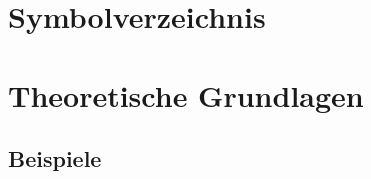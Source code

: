 \documentclass[%
	BCOR12mm, %
	cleardoublepage=empty, %
	tablecaptionabove, %
	toc=bib, %
	toc=listofnumbered, %
	listof=leveldown, %
	numbers=noendperiod %
	]{scrbook}
\begin{document}

\frontmatter

\tableofcontents
\chapter{Symbolverzeichnis} %
\label{cha:symbolverzeichnis}


\mainmatter


\chapter{Theoretische Grundlagen} %
\label{cha:theoretische_grundlagen}

\section{Beispiele} %
\label{sec:beispiele}
\end{document}
